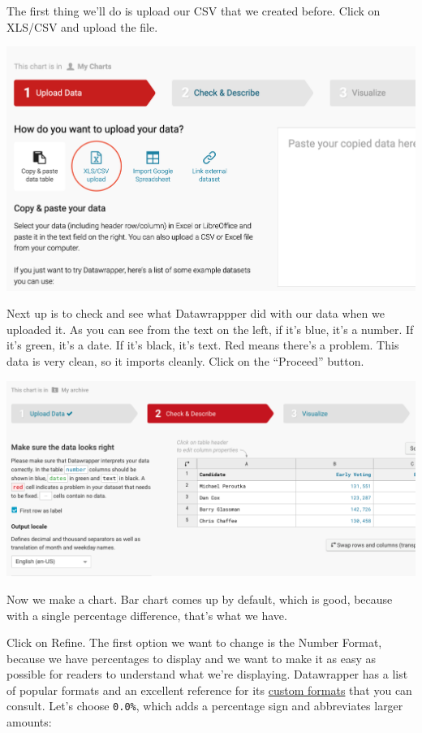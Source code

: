 \documentclass[
  letterpaper,
  DIV=11,
  numbers=noendperiod]{scrreprt}
\begin{document}
The first thing we'll do is upload our CSV that we created before. Click
on XLS/CSV and upload the file.

\includegraphics{./images/datawrapper2.png}

Next up is to check and see what Datawrappper did with our data when we
uploaded it. As you can see from the text on the left, if it's blue,
it's a number. If it's green, it's a date. If it's black, it's text. Red
means there's a problem. This data is very clean, so it imports cleanly.
Click on the ``Proceed'' button.

\includegraphics{./images/datawrapper3.png}

Now we make a chart. Bar chart comes up by default, which is good,
because with a single percentage difference, that's what we have.

Click on Refine. The first option we want to change is the Number
Format, because we have percentages to display and we want to make it as
easy as possible for readers to understand what we're displaying.
Datawrapper has a list of popular formats and an excellent reference for
its
\href{https://academy.datawrapper.de/article/207-custom-number-formats-that-you-can-display-in-datawrapper}{custom
formats} that you can consult. Let's choose \texttt{0.0\%}, which adds a
percentage sign and abbreviates larger amounts:
\end{document}
